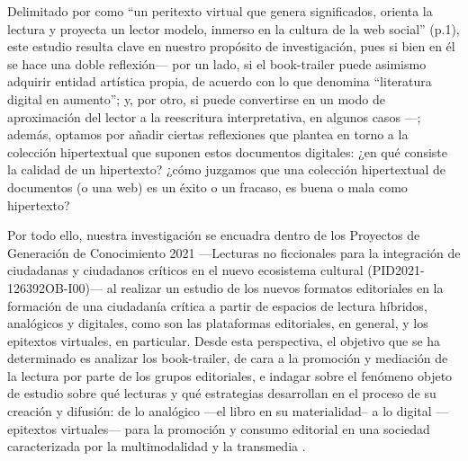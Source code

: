 \documentclass[spanish]{textolivre}
\begin{document}
Delimitado por \textcite{tabernero2022promocion} como “un peritexto virtual que genera significados, orienta la lectura y proyecta un lector modelo, inmerso en la cultura de la web social” (p.1), este estudio resulta clave en nuestro propósito de investigación, pues si bien en él se hace una doble reflexión— por un lado, si el book-trailer puede asimismo adquirir entidad artística propia, de acuerdo con lo que \textcite{unsworth2015persuasive} denomina “literatura digital en aumento”; y, por otro, si puede convertirse en un modo de aproximación del lector a la reescritura interpretativa, en algunos casos \cite{taberneroanalogicos}—; además, optamos por añadir ciertas reflexiones que \textcite{landow2015bueno} plantea en torno a la colección hipertextual que suponen estos documentos digitales: ¿en qué consiste la calidad de un hipertexto? ¿cómo juzgamos que una colección hipertextual de documentos (o una web) es un éxito o un fracaso, es buena o mala como hipertexto?

Por todo ello, nuestra investigación se encuadra dentro de los Proyectos de Generación de Conocimiento 2021 —Lecturas no ficcionales para la integración de ciudadanas y ciudadanos críticos en el nuevo ecosistema cultural (PID2021-126392OB-I00)— al realizar un estudio de los nuevos formatos editoriales en la formación de una ciudadanía crítica a partir de espacios de lectura híbridos, analógicos y digitales, como son las plataformas editoriales, en general, y los epitextos virtuales, en particular. Desde esta perspectiva, el objetivo que se ha determinado es analizar los book-trailer, de cara a la promoción y mediación de la lectura por parte de los grupos editoriales, e indagar sobre el fenómeno objeto de estudio sobre qué lecturas y qué estrategias desarrollan en el proceso de su creación y difusión: de lo analógico —el libro en su materialidad– a lo digital —epitextos virtuales— para la promoción y consumo editorial en una sociedad caracterizada por la multimodalidad y la transmedia \cite{ambros2020cine}.
\end{document}
